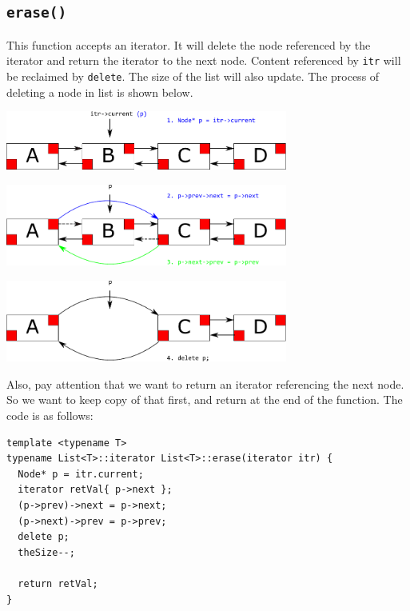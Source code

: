 \documentclass[12pt]{book}
\begin{document}
\subsection{\texttt{erase()}}
\label{sec:orgc58653c}
This function accepts an iterator. It will delete the node referenced by the iterator and return the iterator to the next node. Content referenced by \texttt{itr} will be reclaimed by \texttt{delete}. The size of the list will also update. The process of deleting a node in list is shown below.

\begin{center}
\includegraphics[width=350px]{./img/List-delete-1.pdf}
\end{center}

\begin{center}
\includegraphics[width=350px]{./img/List-delete-2.pdf}
\end{center}

\begin{center}
\includegraphics[width=350px]{./img/List-delete-3.pdf}
\end{center}

Also, pay attention that we want to return an iterator referencing the next node. So we want to keep copy of that first, and return at the end of the function. The code is as follows:
\begin{verbatim}
template <typename T>
typename List<T>::iterator List<T>::erase(iterator itr) {
  Node* p = itr.current;
  iterator retVal{ p->next };
  (p->prev)->next = p->next;
  (p->next)->prev = p->prev;
  delete p;
  theSize--;

  return retVal;
}
\end{verbatim}
\end{document}
